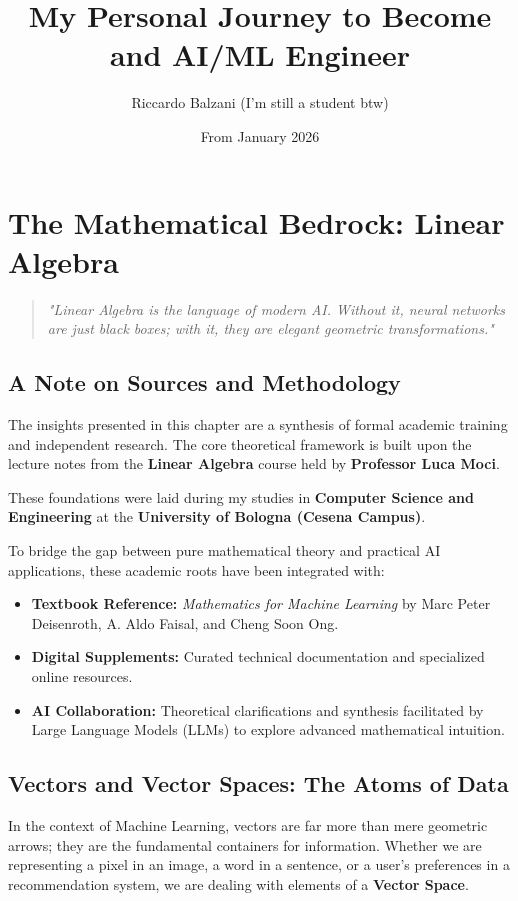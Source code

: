 \documentclass[12pt,a4paper,twoside,openright]{book}
\title{My Personal Journey to Become and AI/ML Engineer}
\author{Riccardo Balzani (I'm still a student btw)}
\date{From January 2026}
\begin{document}
\maketitle

\tableofcontents

\chapter{The Mathematical Bedrock: Linear Algebra}

\begin{quote}
    \textit{"Linear Algebra is the language of modern AI. Without it, neural networks are just black boxes; with it, they are elegant geometric transformations."}
\end{quote}

\section*{A Note on Sources and Methodology}
The insights presented in this chapter are a synthesis of formal academic training and independent research. The core theoretical framework is built upon the lecture notes from the \textbf{Linear Algebra} course held by \textbf{Professor Luca Moci}. 

These foundations were laid during my studies in \textbf{Computer Science and Engineering} at the \textbf{University of Bologna (Cesena Campus)}. 

To bridge the gap between pure mathematical theory and practical AI applications, these academic roots have been integrated with:
\begin{itemize}
    \item \textbf{Textbook Reference:} \textit{Mathematics for Machine Learning} by Marc Peter Deisenroth, A. Aldo Faisal, and Cheng Soon Ong.
    \item \textbf{Digital Supplements:} Curated technical documentation and specialized online resources.
    \item \textbf{AI Collaboration:} Theoretical clarifications and synthesis facilitated by Large Language Models (LLMs) to explore advanced mathematical intuition.
\end{itemize}

\section{Vectors and Vector Spaces: The Atoms of Data}

In the context of Machine Learning, vectors are far more than mere geometric arrows; they are the fundamental containers for information. Whether we are representing a pixel in an image, a word in a sentence, or a user's preferences in a recommendation system, we are dealing with elements of a \textbf{Vector Space}.
\end{document}
